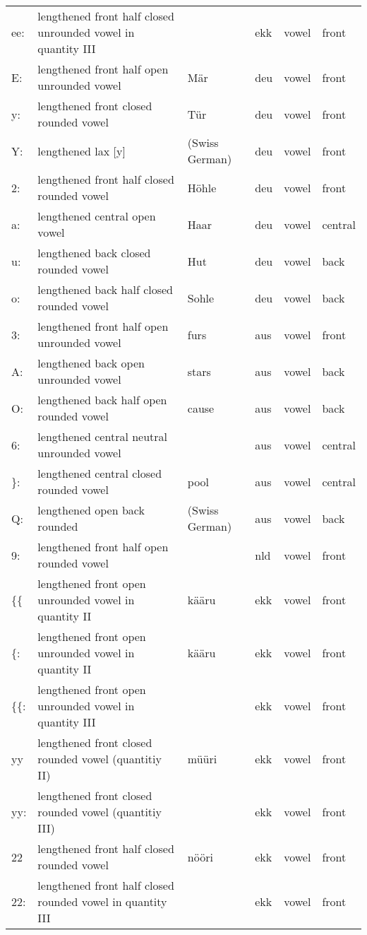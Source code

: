{\begin{longtable}{l|p{.3\linewidth}|p{.15\linewidth}|l|p{.15\linewidth}|l}
	ee:	& lengthened front half closed unrounded vowel in quantity III	& 	& ekk	& vowel	& front	\\
	E:	& lengthened front half open unrounded vowel	& Mär	& deu	& vowel	& front	\\
	y:	& lengthened front closed rounded vowel	& Tür	& deu	& vowel	& front	\\
	Y:	& lengthened lax [y]	& (Swiss German)	& deu	& vowel	& front	\\
	2:	& lengthened front half closed rounded vowel	& Höhle	& deu	& vowel	& front	\\
	a:	& lengthened central open vowel	& Haar	& deu	& vowel	& central	\\
	u:	& lengthened back closed rounded vowel	& Hut	& deu	& vowel	& back	\\
	o:	& lengthened back half closed rounded vowel	& Sohle	& deu	& vowel	& back	\\
	3:	& lengthened front half open unrounded vowel	& furs	& aus	& vowel	& front	\\
	A:	& lengthened back open unrounded vowel	& stars	& aus	& vowel	& back	\\
	O:	& lengthened back half open rounded vowel	& cause	& aus	& vowel	& back	\\
	6:	& lengthened central neutral unrounded vowel	& 	& aus	& vowel	& central	\\
	\}:	& lengthened central closed rounded vowel	& pool	& aus	& vowel	& central	\\
	Q:	& lengthened open back rounded	& (Swiss German)	& aus	& vowel	& back	\\
	9:	& lengthened front half open rounded vowel	& 	& nld	& vowel	& front	\\
	\{\{	& lengthened front open unrounded vowel in quantity II	& kääru	& ekk	& vowel	& front	\\
	\{:	& lengthened front open unrounded vowel in quantity II	& kääru	& ekk	& vowel	& front	\\
	\{\{:	& lengthened front open unrounded vowel in quantity III	& 	& ekk	& vowel	& front	\\
	yy	& lengthened front closed rounded vowel (quantitiy II)	& müüri	& ekk	& vowel	& front	\\
	yy:	& lengthened front closed rounded vowel (quantitiy III)	& 	& ekk	& vowel	& front	\\
	22	& lengthened front half closed rounded vowel	& nööri	& ekk	& vowel	& front	\\
	22:	& lengthened front half closed rounded vowel in quantity III	& 	& ekk	& vowel	& front	\\

\end{longtable}}

